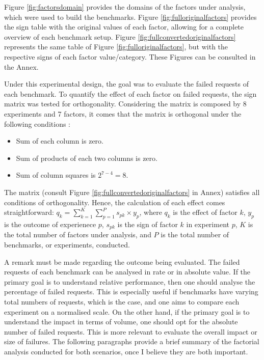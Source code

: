 \documentclass[runningheads]{llncs}
\begin{document}
Figure \ref{fig:factorsdomain} provides the domains of the factors under analysis, which were used to build the benchmarks.
Figure \ref{fig:fulloriginalfactors} provides the sign table with the original values of each factor, allowing for a complete overview of each benchmark setup.
Figure \ref{fig:fullconvertedoriginalfactors} represents the same table of Figure \ref{fig:fulloriginalfactors}, but with the respective signs of each factor value/category.
These Figures can be consulted in the Annex.



Under this experimental design, the goal was to evaluate the failed requests of each benchmark.
To quantify the effect of each factor on failed requests, the sign matrix was tested for orthogonality. Considering the matrix is composed by 8 experiments and 7 factors, it comes that the matrix is orthogonal under the following conditions \cite{mm2024}:

\begin{itemize}
    \item Sum of each column is zero.
    \item Sum of products of each two columns is zero.
    \item Sum of column squares is $2^{7-4} = 8$.
\end{itemize}

The matrix (consult Figure \ref{fig:fullconvertedoriginalfactors} in Annex) satisfies all conditions of orthogonality. Hence, the calculation of each effect comes straightforward: $q_{k}=\sum_{k=1}^{K}\sum_{p=1}^{P}s_{pk} \times y_{p}$, where $q_{k}$ is the effect of factor $k$, $y_{p}$ is the outcome of experienece $p$, $s_{pk}$ is the sign of factor $k$ in experiment $p$, $K$ is the total number of factors under analysis, and $P$ is the total number of benchmarks, or experiments, conducted.

A remark must be made regarding the outcome being evaluated. The failed requests of each benchmark can be analysed in rate or in absolute value. If the primary goal is to understand relative performance, then one should analyse the percentage of failed requests. This is especially useful if benchmarks have varying total numbers of requests, which is the case, and one aims to compare each experiment on a normalised scale. On the other hand, if the primary goal is to understand the impact in terms of volume, one should opt for the absolute number of failed requests. This is more relevant to evaluate the overall impact or size of failures. The following paragraphs provide a brief summary of the factorial analysis conducted for both scenarios, once I believe they are both important.
\end{document}
